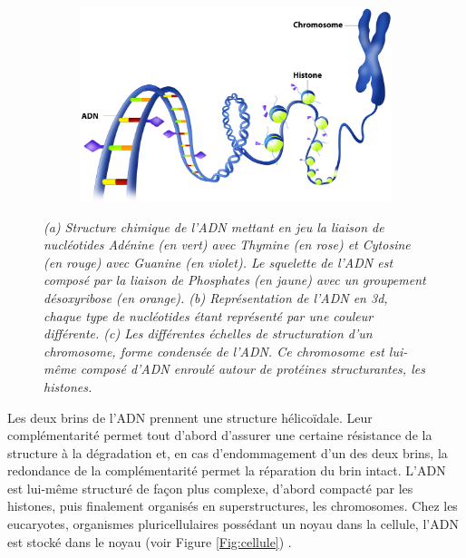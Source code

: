 \begin{figure}
\begin{subfigure}{.35\textwidth}
    \caption{}
    \label{Fig:dna_structure_3d}
  \hspace{0.2cm}
  \end{subfigure}
  \begin{subfigure}{\textwidth}
  \centering
  {\includegraphics[width=0.7\linewidth]{./figures/ch1/chromosome_adn_horizontal.pdf}}
    \caption{}
    \label{Fig:chromosome_adn_2}
  \end{subfigure}
  \caption{\it (a) Structure chimique de l'ADN mettant en jeu la liaison de nucléotides Adénine (en vert) avec Thymine (en rose) et Cytosine (en rouge) avec Guanine (en violet). Le squelette de l'ADN est composé par la liaison de Phosphates (en jaune) avec un groupement désoxyribose (en orange).
  (b) Représentation de l'ADN en 3d, chaque type de nucléotides étant représenté par une couleur différente.
  (c) Les différentes échelles de structuration d'un chromosome, forme condensée de l'ADN. Ce chromosome est lui-même composé d'ADN enroulé autour de protéines structurantes, les histones.}
\end{figure}

Les deux brins de l'ADN prennent une structure hélicoïdale. Leur complémentarité permet tout d'abord d'assurer une certaine résistance de la structure à la dégradation et, en cas d'endommagement d'un des deux brins, la redondance de la complémentarité permet la réparation du brin intact.
L'ADN est lui-même structuré de façon plus complexe, d'abord compacté par les histones, puis finalement organisés en superstructures, les chromosomes. 
Chez les eucaryotes, organismes pluricellulaires possédant un noyau dans la cellule, l'ADN est stocké dans le noyau (voir Figure \ref{Fig:cellule}) \cite{johnson2011biologie}. 




